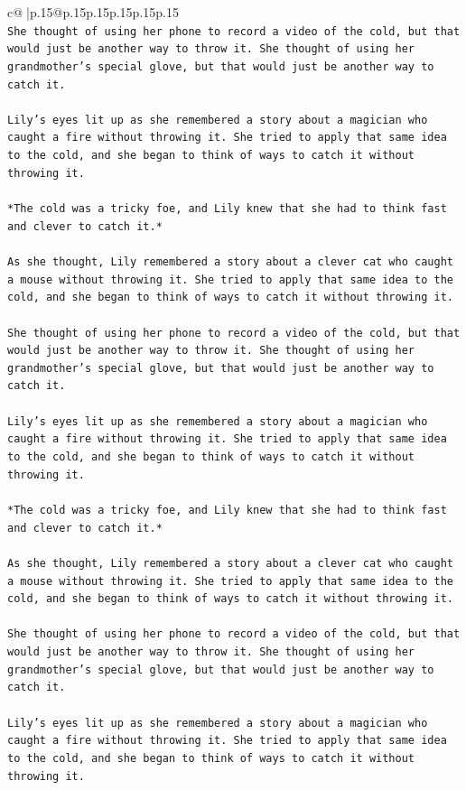 \documentclass{article}
\begin{document}
{\begin{supertabular}{c@{$\;$}|p{.15\linewidth}@{}p{.15\linewidth}p{.15\linewidth}p{.15\linewidth}p{.15\linewidth}p{.15\linewidth}}
{{{\\ 
\texttt{She thought of using her phone to record a video of the cold, but that would just be another way to throw it. She thought of using her grandmother's special glove, but that would just be another way to catch it.} \\
\\ 
\texttt{Lily's eyes lit up as she remembered a story about a magician who caught a fire without throwing it. She tried to apply that same idea to the cold, and she began to think of ways to catch it without throwing it.} \\
\\ 
\texttt{*The cold was a tricky foe, and Lily knew that she had to think fast and clever to catch it.*} \\
\\ 
\texttt{As she thought, Lily remembered a story about a clever cat who caught a mouse without throwing it. She tried to apply that same idea to the cold, and she began to think of ways to catch it without throwing it.} \\
\\ 
\texttt{She thought of using her phone to record a video of the cold, but that would just be another way to throw it. She thought of using her grandmother's special glove, but that would just be another way to catch it.} \\
\\ 
\texttt{Lily's eyes lit up as she remembered a story about a magician who caught a fire without throwing it. She tried to apply that same idea to the cold, and she began to think of ways to catch it without throwing it.} \\
\\ 
\texttt{*The cold was a tricky foe, and Lily knew that she had to think fast and clever to catch it.*} \\
\\ 
\texttt{As she thought, Lily remembered a story about a clever cat who caught a mouse without throwing it. She tried to apply that same idea to the cold, and she began to think of ways to catch it without throwing it.} \\
\\ 
\texttt{She thought of using her phone to record a video of the cold, but that would just be another way to throw it. She thought of using her grandmother's special glove, but that would just be another way to catch it.} \\
\\ 
\texttt{Lily's eyes lit up as she remembered a story about a magician who caught a fire without throwing it. She tried to apply that same idea to the cold, and she began to think of ways to catch it without throwing it.} \\
}}}
\end{supertabular}}
\end{document}
